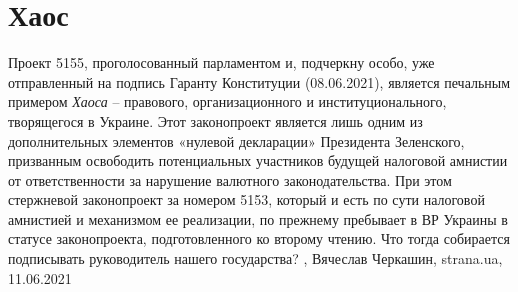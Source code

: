  
 
 
 
 
\chapter{Хаос}

Проект 5155, проголосованный парламентом и, подчеркну особо, уже отправленный
на подпись Гаранту Конституции (08.06.2021), является печальным примером \emph{Хаоса}
– правового, организационного и институционального, творящегося в Украине. Этот
законопроект является лишь одним из дополнительных элементов «нулевой
декларации» Президента Зеленского, призванным освободить потенциальных
участников будущей налоговой амнистии от ответственности за нарушение валютного
законодательства. При этом стержневой законопроект за номером 5153, который и
есть по сути налоговой амнистией и механизмом ее реализации, по прежнему
пребывает в ВР Украины в статусе законопроекта, подготовленного ко второму
чтению. Что тогда собирается подписывать руководитель нашего государства?
, Вячеслав Черкашин, strana.ua, 11.06.2021

